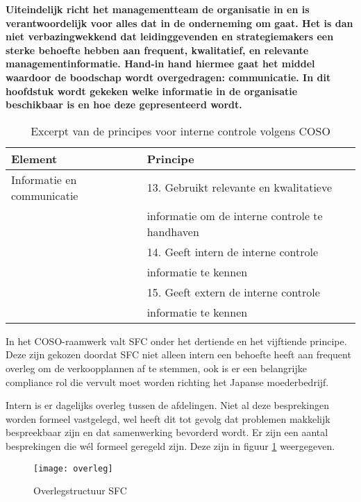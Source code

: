 \textbf{Uiteindelijk richt het managementteam de organisatie in en is verantwoordelijk voor alles dat in de onderneming om gaat. Het is dan niet verbazingwekkend dat leidinggevenden en strategiemakers een sterke behoefte hebben aan frequent, kwalitatief, en relevante managementinformatie. Hand-in hand hiermee gaat het middel waardoor de boodschap wordt overgedragen: communicatie. In dit hoofdstuk wordt gekeken welke informatie in de organisatie beschikbaar is en hoe deze gepresenteerd wordt.}

\begin{table}[!h]
    \centering
    \caption{Excerpt van de principes voor interne controle volgens COSO}
    \begin{tabular}{l l}
        \toprule
        \textbf{Element} & \textbf{Principe} \\
        \midrule
        Informatie en communicatie & 13. Gebruikt relevante en kwalitatieve \\
        & informatie om de interne controle te handhaven \\
         & 14. Geeft intern de interne controle \\
         & informatie te kennen \\
         & 15. Geeft extern de interne controle \\
         & informatie te kennen \\
        \bottomrule
    \end{tabular}
    \label{tab:informatieprincipes}
\end{table}

In het COSO-raamwerk valt SFC onder het dertiende en het vijftiende principe. Deze zijn gekozen doordat SFC niet alleen intern een behoefte heeft aan frequent overleg om de verkoopplannen af te stemmen, ook is er een belangrijke compliance rol die vervult moet worden richting het Japanse moederbedrijf. 

Intern is er dagelijks overleg tussen de afdelingen. Niet al deze besprekingen worden formeel vastgelegd, wel heeft dit tot gevolg dat problemen makkelijk bespreekbaar zijn en dat samenwerking bevorderd wordt. Er zijn een aantal besprekingen die wél formeel geregeld zijn. Deze zijn in figuur \ref{fig:overleg2} weergegeven. 

\newpage

\begin{figure}[h!]
    \centering
    \texttt{[image: overleg]}
    \caption{Overlegstructuur SFC \citep{aoibsfc}}
    \label{fig:overleg2}
\end{figure}

